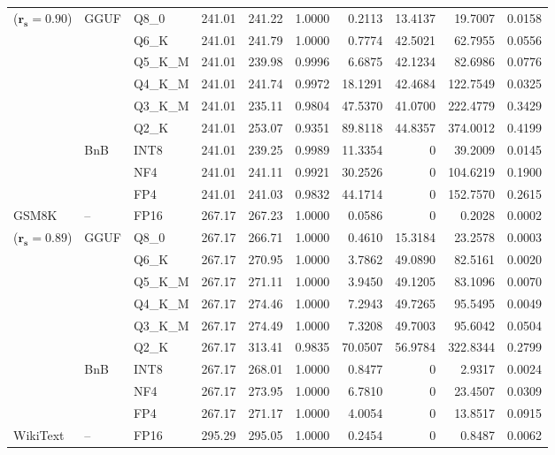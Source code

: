 \begin{longtable}{ll l rrrrrrr}
{\small ($\mathbf{r_s{=}0.90}$)} & GGUF & Q8\_0 & 241.01 & 241.22 & 1.0000 & 0.2113 & 13.4137 & 19.7007 & 0.0158 \\
 &  & Q6\_K & 241.01 & 241.79 & 1.0000 & 0.7774 & 42.5021 & 62.7955 & 0.0556 \\
 &  & Q5\_K\_M & 241.01 & 239.98 & 0.9996 & 6.6875 & 42.1234 & 82.6986 & 0.0776 \\
 &  & Q4\_K\_M & 241.01 & 241.74 & 0.9972 & 18.1291 & 42.4684 & 122.7549 & 0.0325 \\
 &  & Q3\_K\_M & 241.01 & 235.11 & 0.9804 & 47.5370 & 41.0700 & 222.4779 & 0.3429 \\
 &  & Q2\_K & 241.01 & 253.07 & \cellcolor{red!18} 0.9351 & \cellcolor{red!18} 89.8118 & 44.8357 & \cellcolor{red!18} 374.0012 & \cellcolor{red!18} 0.4199 \\
 & BnB & INT8 & 241.01 & 239.25 & 0.9989 & 11.3354 & \cellcolor{cyan!12} $0$ & 39.2009 & 0.0145 \\
 &  & NF4 & 241.01 & 241.11 & 0.9921 & 30.2526 & \cellcolor{cyan!12} $0$ & 104.6219 & 0.1900 \\
 &  & FP4 & 241.01 & 241.03 & 0.9832 & 44.1714 & \cellcolor{cyan!12} $0$ & 152.7570 & 0.2615 \\
\midrule
GSM8K & -- & FP16 & 267.17 & 267.23 & 1.0000 & 0.0586 & \cellcolor{cyan!12} $0$ & 0.2028 & 0.0002 \\
{\small ($\mathbf{r_s{=}0.89}$)} & GGUF & Q8\_0 & 267.17 & 266.71 & 1.0000 & 0.4610 & 15.3184 & 23.2578 & 0.0003 \\
 &  & Q6\_K & 267.17 & 270.95 & 1.0000 & 3.7862 & 49.0890 & 82.5161 & 0.0020 \\
 &  & Q5\_K\_M & 267.17 & 271.11 & 1.0000 & 3.9450 & 49.1205 & 83.1096 & 0.0070 \\
 &  & Q4\_K\_M & 267.17 & 274.46 & 1.0000 & 7.2943 & 49.7265 & 95.5495 & 0.0049 \\
 &  & Q3\_K\_M & 267.17 & 274.49 & 1.0000 & 7.3208 & 49.7003 & 95.6042 & 0.0504 \\
 &  & Q2\_K & 267.17 & 313.41 & 0.9835 & 70.0507 & 56.9784 & 322.8344 & 0.2799 \\
 & BnB & INT8 & 267.17 & 268.01 & 1.0000 & 0.8477 & \cellcolor{cyan!12} $0$ & 2.9317 & 0.0024 \\
 &  & NF4 & 267.17 & 273.95 & 1.0000 & 6.7810 & \cellcolor{cyan!12} $0$ & 23.4507 & 0.0309 \\
 &  & FP4 & 267.17 & 271.17 & 1.0000 & 4.0054 & \cellcolor{cyan!12} $0$ & 13.8517 & 0.0915 \\
\midrule
WikiText & -- & FP16 & 295.29 & 295.05 & 1.0000 & 0.2454 & \cellcolor{cyan!12} $0$ & 0.8487 & 0.0062 \\

\end{longtable}
